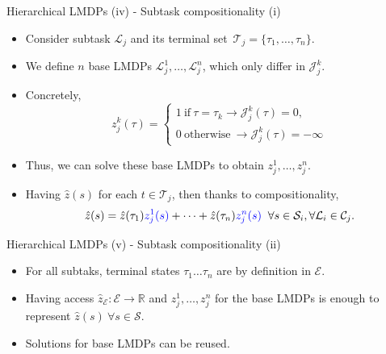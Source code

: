 \documentclass{beamer}
\theoremstyle{mystyle}
\newcommand{\cC}{\mathcal{C}}
\newcommand{\cE}{\mathcal{E}}
\newcommand{\cJ}{\mathcal{J}}
\newcommand{\cL}{\mathcal{L}}
\newcommand{\cS}{\mathcal{S}}
\newcommand{\cT}{\mathcal{T}}
\begin{document}
\begin{frame}{Hierarchical LMDPs (iv) - Subtask compositionality (i)}

\begin{itemize}
    \item Consider subtask $\cL_j$ and its terminal set~$\cT_j=\{\tau_1,\ldots,\tau_n\}$.
    \item We define {\color{blue} $n$ base LMDPs $\cL_j^1,\ldots,\cL_j^n$}, which only differ in $\cJ_j^k$.
    \item Concretely, 
    \[ 
        z_j^k(\tau)=\begin{cases}
            1 \ \text{if} \ \tau=\tau_k \rightarrow \cJ_j^k(\tau)=0,\\
            0 \ \text{otherwise} \ \rightarrow \cJ_j^k(\tau)=-\infty
        \end{cases}
    \]
    \item Thus, we can solve these {\color{blue} base LMDPs} to obtain {\color{blue} $z_j^1,\ldots,z_j^n$.}
    \item Having $\hat z(s)$ for each $t \in \cT_j$, then thanks to compositionality,
    \begin{equation*}
        \hat{z}(s)=\hat{z}(\tau_1){\color{blue} z_j^1(s)}+\cdots+\hat{z}(\tau_n){\color{blue} z_j^n(s)} \;\; \forall s\in\cS_i,\forall\cL_i\in\cC_j.
    \end{equation*}
\end{itemize}

    
\end{frame}


\begin{frame}{Hierarchical LMDPs (v) - Subtask compositionality (ii)}


\begin{itemize}

    
   \item For all subtaks, terminal states $\tau_1 \dots \tau_n$ are by definition in $\cE$.
   \item Having access $\hat{z}_\cE:\cE\rightarrow\mathbb{R}$ and $z_j^1,\ldots,z_j^n$ for the base LMDPs {\color{blue} is enough to represent $\hat z(s) \ \forall s \in \cS$.}
   \item Solutions for base LMDPs {\color{blue} can be reused}. 
    
\end{itemize}

\end{frame}
\end{document}
